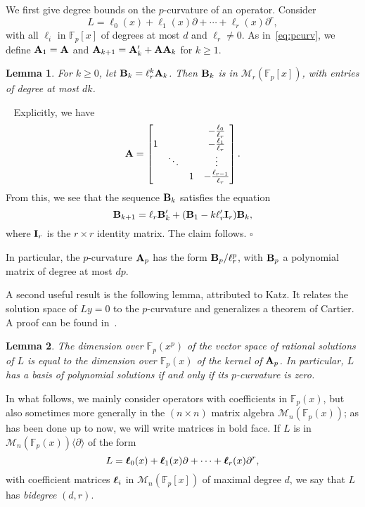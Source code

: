\documentclass{sig-alternate}
\def\bell{\mbox{\boldmath$\ell$}}
\def\F {\mathbb{F}}
\def\mA {\ensuremath{{\bf A}}}
\def\mB {\ensuremath{{\bf B}}}
\def\mI {\ensuremath{{\bf I}}}
\def\myproof{\noindent{\sc Proof.}~}
\def\foorp{\hfill$\square$}
\newtheorem{Lemma}{Lemma}
\begin{document}
We first give degree bounds on the $p$-curvature of an operator.
Consider 
\begin{equation}
  \label{eq:L}
L = \ell_0(x) + \ell_1(x) \partial + \cdots + \ell_r(x) \partial^r,  
\end{equation}
with all $\ell_i$ in $\F_p[x]$ of degrees at most $d$ and $\ell_r \ne
0$. As in~\eqref{eq:pcurv}, we define $\mA_1 = \mA$ and $\mA_{k+1} =
\mA_k' + \mA \mA_k$ for $k \ge 1$.
\begin{Lemma}\label{lemma:1}
  For $k \ge 0$, let $\mB_k = \ell_r^k \mA_k$. Then $\mB_k$ is in
  $\mathscr{M}_r(\F_p[x])$, with entries of degree at most $dk$.
\end{Lemma}
\myproof
Explicitly, we have
$$\mA = \left [ \begin{matrix}
  & &&  -\frac{\ell_0}{\ell_r} \\
1 & &&   -\frac{\ell_1}{\ell_r} \\
  &\ddots &&  \vdots \\
  &     &1& -\frac{\ell_{r-1}}{\ell_r}
\end{matrix} \right ].$$ From this, we see that the sequence $\mB_k$
satisfies the equation
$$\mB_{k+1} =  \ell_r \mB_k' + (\mB_1 - k \ell'_r \mI_r)\mB_k,$$
where $\mI_r$ is the $r\times r$ identity matrix. The claim
follows.  \foorp

\smallskip\noindent In particular, the $p$-curvature $\mA_p$ has
the form $\mB_p/\ell_r^p$, with $\mB_p$ a polynomial matrix of degree
at most $dp$.



A second useful result is the following lemma, attributed to Katz. It
relates the solution space of $Ly=0$ to the $p$-curvature and
generalizes a theorem of Cartier.  A proof can be found
in~\cite[Th.~3.8]{Cluzeau03}.



\begin{Lemma}\label{lemma:pcurv-vs-ratsols}
  The dimension over $\F_p(x^p)$ of the vector space of rational
  solutions of $L$ is equal to the dimension over $\F_p(x)$ of the
  kernel of $\mA_p$.  In particular, $L$ has a basis of polynomial
  solutions if and only if its $p$-curvature is zero.
\end{Lemma}

\smallskip{} In what follows, we mainly
consider operators with coefficients in $\F_p(x)$, but also sometimes
more generally in the $(n\times n)$ matrix algebra
$\mathscr{M}_n(\F_p(x))$;  as has been done up to now, we will write 
matrices in bold face. If $L$ is in
$\mathscr{M}_n(\F_p(x))\langle \partial \rangle$ of the form
$$L = \bell_0(x) + \bell_1(x) \partial + \cdots + \bell_r(x) \partial^r,$$
with coefficient matrices $\bell_i$ in $\mathscr{M}_n(\F_p[x])$ of
maximal degree $d$, we say that $L$ has {\em bidegree} $(d,r)$. 
\end{document}
